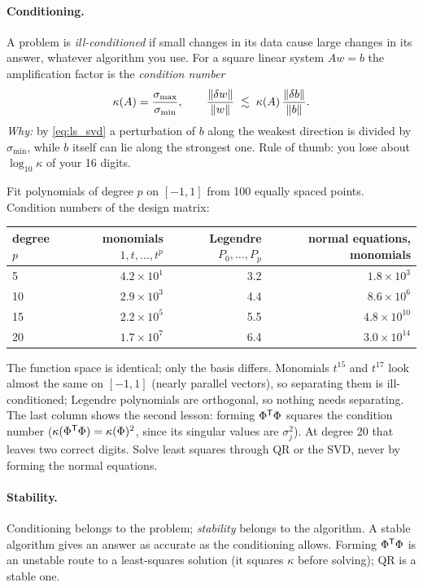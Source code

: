 \paragraph{Conditioning.} A problem is \emph{ill-conditioned} if small changes in its data cause large changes in its
answer, whatever algorithm you use. For a square linear system $Aw = b$ the amplification factor is the
\emph{condition number}
\begin{equation}
  \kappa(A) = \frac{\sigma_{\max}}{\sigma_{\min}},
  \qquad
  \frac{\lVert \delta w\rVert}{\lVert w\rVert} \;\lesssim\; \kappa(A)\, \frac{\lVert \delta b\rVert}{\lVert b\rVert} .
\end{equation}
\emph{Why:} by \eqref{eq:ls_svd} a perturbation of $b$ along the weakest direction is divided by $\sigma_{\min}$,
while $b$ itself can lie along the strongest one. Rule of thumb: you lose about $\log_{10}\kappa$ of your 16 digits.

\begin{example}
Fit polynomials of degree $p$ on $[-1,1]$ from 100 equally spaced points. Condition numbers of the design matrix:
\begin{center}
\begin{tabular}{lrrr}
\toprule
degree $p$ & monomials $1,t,\dots,t^p$ & Legendre $P_0,\dots,P_p$ & normal equations, monomials \\
\midrule
5  & $4.2\times10^{1}$ & 3.2 & $1.8\times10^{3}$ \\
10 & $2.9\times10^{3}$ & 4.4 & $8.6\times10^{6}$ \\
15 & $2.2\times10^{5}$ & 5.5 & $4.8\times10^{10}$ \\
20 & $1.7\times10^{7}$ & 6.4 & $3.0\times10^{14}$ \\
\bottomrule
\end{tabular}
\end{center}
The function space is identical; only the basis differs. Monomials $t^{15}$ and $t^{17}$ look almost the same on
$[-1,1]$ (nearly parallel vectors), so separating them is ill-conditioned; Legendre polynomials are orthogonal, so
nothing needs separating. The last column shows the second lesson: forming $\Phi^{\mathsf{T}}\Phi$ squares the condition
number ($\kappa(\Phi^{\mathsf{T}}\Phi) = \kappa(\Phi)^2$, since its singular values are $\sigma_j^2$). At degree 20 that leaves
two correct digits. Solve least squares through QR or the SVD, never by forming the normal equations.
\end{example}

\paragraph{Stability.} Conditioning belongs to the problem; \emph{stability} belongs to the algorithm. A stable
algorithm gives an answer as accurate as the conditioning allows. Forming $\Phi^{\mathsf{T}}\Phi$ is an unstable route to a
least-squares solution (it squares $\kappa$ before solving); QR is a stable one.


